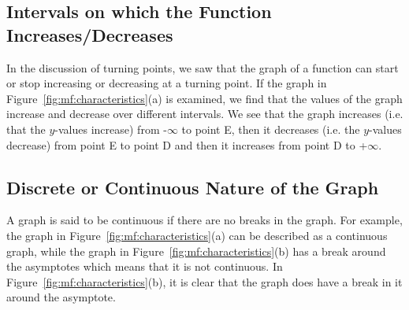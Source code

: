 \documentclass[10pt,a4paper,titlepage,twoside,openright]{report}
\begin{document}
\subsection{Intervals on which the Function Increases/Decreases}
In the discussion of turning points, we saw that the graph of a function can start or stop increasing or decreasing at a turning point. If the graph in Figure~\ref{fig:mf:characteristics}(a) is examined, we find that the values of the graph increase and decrease over different intervals. We see that the graph increases (i.e. that the $y$-values increase) from -$\infty$ to point E, then it decreases (i.e. the $y$-values decrease) from point E to point D and then it increases from point D to +$\infty$.

\subsection{Discrete or Continuous Nature of the Graph}
A graph is said to be continuous if there are no breaks in the graph. For example, the graph in Figure~\ref{fig:mf:characteristics}(a) can be described as a continuous graph, while the graph in Figure~\ref{fig:mf:characteristics}(b) has a break around the asymptotes which means that it is not continuous.
In Figure~\ref{fig:mf:characteristics}(b), it is clear that the graph does have a break in it around the asymptote.
\end{document}
